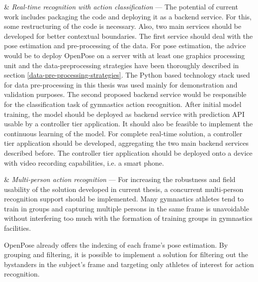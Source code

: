 \begin{easylist}[enumerate]

& \textit{Real-time recognition with action classification} --- The potential of current work includes packaging the code and deploying it as a backend service. For this, some restructuring of the code is necessary. Also, two main services should be developed for better contextual boundaries. The first service should deal with the pose estimation and pre-processing of the data. For pose estimation, the advice would be to deploy OpenPose on a server with at least one graphics processing unit and the data-preprocessing strategies have been thoroughly described in section \ref{data-pre-processing-strategies}. The Python based technology stack used for data pre-processing in this thesis was used mainly for demonstration and validation purposes. The second proposed backend service would be responsible for the classification task of gymnastics action recognition. After initial model training, the model should be deployed as backend service with prediction API usable by a controller tier application. It should also be feasible to implement the continuous learning of the model. For complete real-time solution, a controller tier application should be developed, aggregating the two main backend services described before. The controller tier application should be deployed onto a device with video recording capabilities, i.e. a smart phone.

& \textit{Multi-person action recognition} --- For increasing the robustness and field usability of the solution developed in current thesis, a concurrent multi-person recognition support should be implemented. Many gymnastics athletes tend to train in groups and capturing multiple persons in the same frame is unavoidable without interfering too much with the formation of training groups in gymnastics facilities. 

OpenPose already offers the indexing of each frame's pose estimation. By grouping and filtering, it is possible to implement a solution for filtering out the bystanders in the subject's frame and targeting only athletes of interest for action recognition.


\end{easylist}
